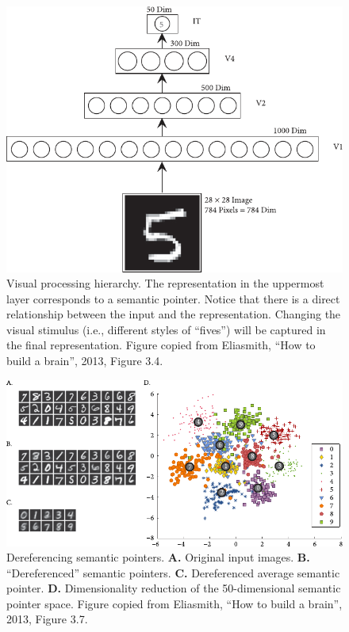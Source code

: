 \documentclass[10pt,letterpaper,oneside]{article}
\begin{document}
\begin{figure}[p]
	\centering
	\includegraphics[scale=1.15]{media/htbab_hierarchy.pdf}
	\caption{Visual processing hierarchy. The representation in the uppermost layer corresponds to a semantic pointer. Notice that there is a direct relationship between the input and the representation. Changing the visual stimulus (i.e., different styles of \enquote{fives}) will be captured in the final representation. Figure copied from Eliasmith, \enquote{How to build a brain}, 2013, Figure 3.4.}
	\label{fig:htbab_hierarchy}
\end{figure}

\begin{figure}[p]
	\centering
	\includegraphics[scale=1.15]{media/htbab_dereference.pdf}
	\caption{Dereferencing semantic pointers. \textbf{A.} Original input images. \textbf{B.} \enquote{Dereferenced} semantic pointers. \textbf{C.} Dereferenced average semantic pointer. \textbf{D.} Dimensionality reduction of the 50-dimensional semantic pointer space. Figure copied from Eliasmith, \enquote{How to build a brain}, 2013, Figure 3.7.}
	\label{fig:htbab_dereference}
\end{figure}
\end{document}
